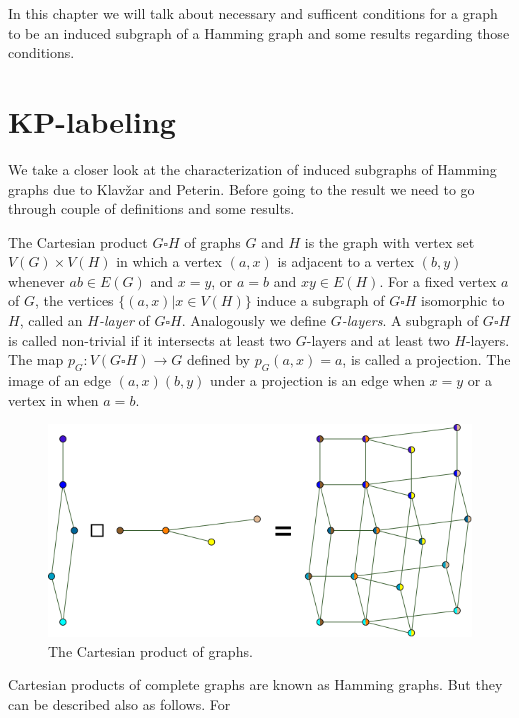 \documentclass[12pt,a4paper,titlepage,openany]{report}
\begin{document}
In this chapter we will talk about necessary and sufficent conditions for a graph to be an induced subgraph of a Hamming graph and some results regarding those conditions.  

\section{KP-labeling}\label{kp-labeling-section}
We take a closer look at the characterization of induced subgraphs of Hamming graphs due to Klav\v zar and Peterin. \newline
Before going to the result we need to go through couple of definitions and some results.
\newline

The Cartesian product $G\square H$ of graphs $G$ and $H$ is the graph with vertex set $V(G)\times V(H)$ in which a vertex $(a,x)$ is adjacent to a vertex $(b,y)$ whenever
$ab\in E(G)$ and $x=y$, or $a=b$ and $xy\in E(H)$. For a fixed vertex $a$ of $G$, the vertices $\{(a,x)|x\in V(H)\}$ induce a subgraph of $G \square H$ isomorphic to $H$, called an \textit{$H$-layer} of $G \square H$. Analogously we define \textit{$G$-layers}. A subgraph of $G \square H$ is called non-trivial if it intersects at least two $G$-layers and at least two $H$-layers. \newline
The map $p_G:V(G\square H) \to G$ defined by $p_G(a,x)=a$, is called a projection. The image of an edge $(a,x)(b,y)$ under a projection is an edge when $x=y$ or a vertex in when $a=b$.\newline
\begin{figure}\label{fig:cartProduct}
\centering
\includegraphics[scale=0.45]{figures/Graph-Cartesian-product.png}
\caption{The Cartesian product of graphs.}

\end{figure}
Cartesian products of complete graphs are known as Hamming graphs. But they can be described also as follows. For
\end{document}
